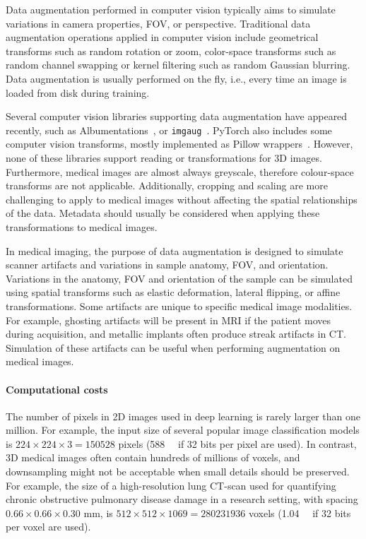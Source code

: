 Data augmentation performed in computer vision typically aims to simulate variations in camera properties, \ac{FOV}, or perspective.
Traditional data augmentation operations applied in computer vision include geometrical transforms such as random rotation or zoom, color-space transforms such as random channel swapping or kernel filtering such as random Gaussian blurring.
Data augmentation is usually performed on the fly, i.e., every time an image is loaded from disk during training.

Several computer vision libraries supporting data augmentation have appeared recently, such as Albumentations~\cite{buslaev_albumentations_2020}, or \texttt{imgaug}~\cite{jung_imgaug_2020}.
PyTorch also includes some computer vision transforms, mostly implemented as Pillow wrappers~\cite{wiredfool_pillow_2016}.
However, none of these libraries support reading or transformations for 3D images.
Furthermore, medical images are almost always greyscale, therefore colour-space transforms are not applicable.
Additionally, cropping and scaling are more challenging to apply to medical images without affecting the spatial relationships of the data.
Metadata should usually be considered when applying these transformations to medical images.

In medical imaging, the purpose of data augmentation is designed to simulate scanner artifacts and variations in sample anatomy, \ac{FOV}, and orientation.
Variations in the anatomy, \ac{FOV} and orientation of the sample can be simulated using spatial transforms such as elastic deformation, lateral flipping, or affine transformations.
Some artifacts are unique to specific medical image modalities.
For example, ghosting artifacts will be present in \ac{MRI} if the patient moves during acquisition, and metallic implants often produce streak artifacts in \ac{CT}.
Simulation of these artifacts can be useful when performing augmentation on medical images.


\paragraph{Computational costs}
\label{sec:computation}
The number of pixels in 2D images used in deep learning is rarely larger than one million.
For example, the input size of several popular image classification models is $224 \times 224 \times 3 = \num{150528}$ pixels (\SI{588}{\kibi\byte} if 32 bits per pixel are used).
In contrast, 3D medical images often contain hundreds of millions of voxels, and downsampling might not be acceptable when small details should be preserved.
For example, the size of a high-resolution lung \ac{CT}-scan used for quantifying chronic obstructive pulmonary disease damage in a research setting, with spacing $0.66 \times 0.66 \times 0.30$ mm, is $512 \times 512 \times 1069 = \num{280231936}$ voxels (\SI{1.04}{\gibi\byte} if 32 bits per voxel are used).


